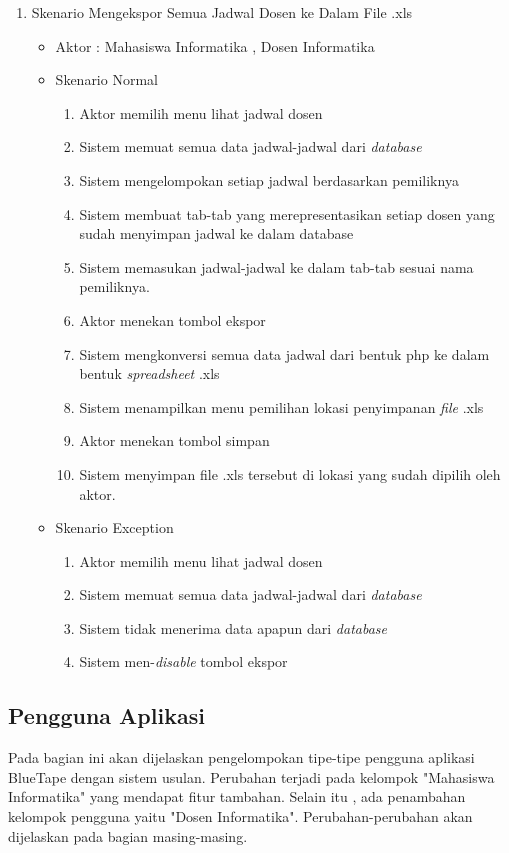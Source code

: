 \begin{enumerate}
	\item Skenario Mengekspor Semua Jadwal Dosen ke Dalam File .xls
	\begin{itemize}
		\item Aktor : Mahasiswa Informatika , Dosen Informatika
		\item Skenario Normal
			\begin{enumerate}[1.]
				\item Aktor memilih menu lihat jadwal dosen
				\item Sistem memuat semua data jadwal-jadwal dari \textit{database}
				\item Sistem mengelompokan setiap jadwal berdasarkan pemiliknya
				\item Sistem membuat tab-tab yang merepresentasikan setiap dosen yang sudah menyimpan jadwal ke dalam database
				\item Sistem memasukan jadwal-jadwal ke dalam tab-tab sesuai nama pemiliknya.
				\item Aktor menekan tombol ekspor
				\item Sistem mengkonversi semua data jadwal dari bentuk php ke dalam bentuk \textit{spreadsheet} .xls
				\item Sistem menampilkan menu pemilihan lokasi penyimpanan \textit{file} .xls
				\item Aktor menekan tombol simpan
				\item Sistem menyimpan file .xls tersebut di lokasi yang sudah dipilih oleh aktor.
			\end{enumerate}
		\item Skenario Exception
			\begin{enumerate}[1.]
				\item Aktor memilih menu lihat jadwal dosen
				\item Sistem memuat semua data jadwal-jadwal dari \textit{database}
				\item Sistem tidak menerima data apapun dari \textit{database}
				\item Sistem men-\textit{disable} tombol ekspor
			\end{enumerate}
	\end{itemize}
\end{enumerate}

\subsection{Pengguna Aplikasi}
Pada bagian ini akan dijelaskan pengelompokan tipe-tipe pengguna aplikasi BlueTape dengan sistem usulan. Perubahan terjadi pada kelompok "Mahasiswa Informatika" yang mendapat fitur tambahan. Selain itu , ada penambahan kelompok pengguna yaitu "Dosen Informatika". Perubahan-perubahan akan dijelaskan pada bagian masing-masing.

